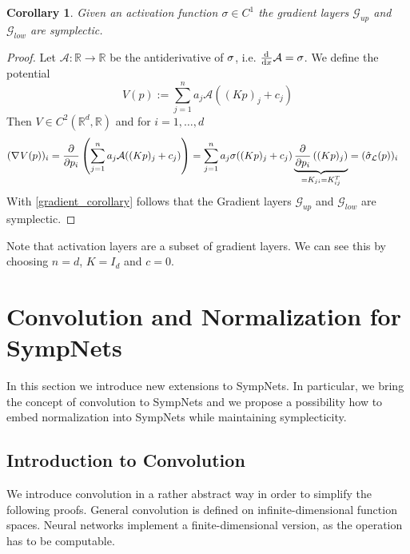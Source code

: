 \documentclass[twoside,a4paper]{article}
\newtheorem{corollary}{Corollary}
\begin{document}
\begin{corollary}
	Given an activation function $\sigma \in C^1$ the gradient layers $\mathcal{G}_{up}$
	and $\mathcal{G}_{low}$ are symplectic.
\end{corollary}
\begin{proof}
	Let $\mathcal{A}: \mathbb{R} \to \mathbb{R}$ be the antiderivative of $\sigma$, 
	i.e. $\frac{\mathrm{d}^{}}{\mathrm{d}x} \mathcal{A} = \sigma$. We define the potential
	\begin{equation*}
		V(p) := \sum_{j=1}^n a_j \mathcal{A}((Kp)_j + c_j)
	\end{equation*}
	Then $V \in C^2(\mathbb{R}^d, \mathbb{R})$ and for $i=1, \dots, d$
	\begin{align*}
		(\nabla_{}{V(p)})_i &= \frac{\partial }{\partial p_i} \left( \sum_{j=1}^n a_j \mathcal{A}((Kp)_j + c_j) \right)
		= \sum_{j=1}^n a_j \sigma((Kp)_j + c_j) 
		\underbrace{\frac{\partial }{\partial p_i} \left( (Kp)_j \right)}_{=K_{ji} = K^T_{ij}}
		= (\hat{\sigma}_{\mathcal{L}}(p))_i
	\end{align*}
	With \cref{gradient_corollary} follows that the Gradient layers
	$\mathcal{G}_{up}$ and $\mathcal{G}_{low}$ are symplectic.
\end{proof}

Note that activation layers are a subset of gradient layers. We can see this by choosing
$n=d$, $K=I_d$ and $c=0$.



\section{Convolution and Normalization for SympNets}

In this section we introduce new extensions to SympNets. In particular, we bring the concept
of convolution to SympNets and we propose a possibility how to embed normalization into SympNets while
maintaining symplecticity.

\subsection{Introduction to Convolution}


We introduce convolution in a rather abstract way in order to simplify the following proofs.
General convolution is defined on infinite-dimensional function spaces.
Neural networks implement a finite-dimensional version, as the operation has to be
computable.
\end{document}
